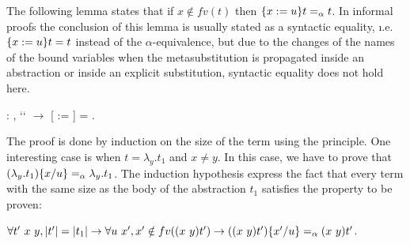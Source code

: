 The following lemma states that if $x \notin fv(t)$ then $\metasub{t}{x}{u} =_\alpha t$. In informal proofs the conclusion of this lemma is usually stated as a syntactic equality, {\i.e.} $\metasub{t}{x}{u} = t$ instead of the $\alpha$-equivalence, but due to the changes of the names of the bound variables when the metasubstitution is propagated inside an abstraction or inside an explicit substitution, syntactic equality does not hold here. 
\begin{coqdoccode}
\coqdocemptyline
\coqdocnoindent
{} : \coqdockw{\ensuremath{\forall}}   ,  ``   \ensuremath{\rightarrow} [ := ] = .\coqdoceol
\end{coqdoccode}
 The proof is done by induction on the size of the term  using the  principle. One interesting case is when $t = \lambda_y.t_1$ and $x \neq y$. In this case, we have to prove that $(\lambda_y.t_1)\msub{x}{u} =_\alpha \lambda_y.t_1$. The induction hypothesis express the fact that every term with the same size as the body of the abstraction $t_1$ satisfies the property to be proven:


$\forall t'\ x\ y, |t'| = |t_1| \to \forall u\ x', x' \notin fv(\swap{x}{y}{t'}) \to (\swap{x}{y}{t'})\msub{x'}{u} =_\alpha \swap{x}{y}{t'}$.


